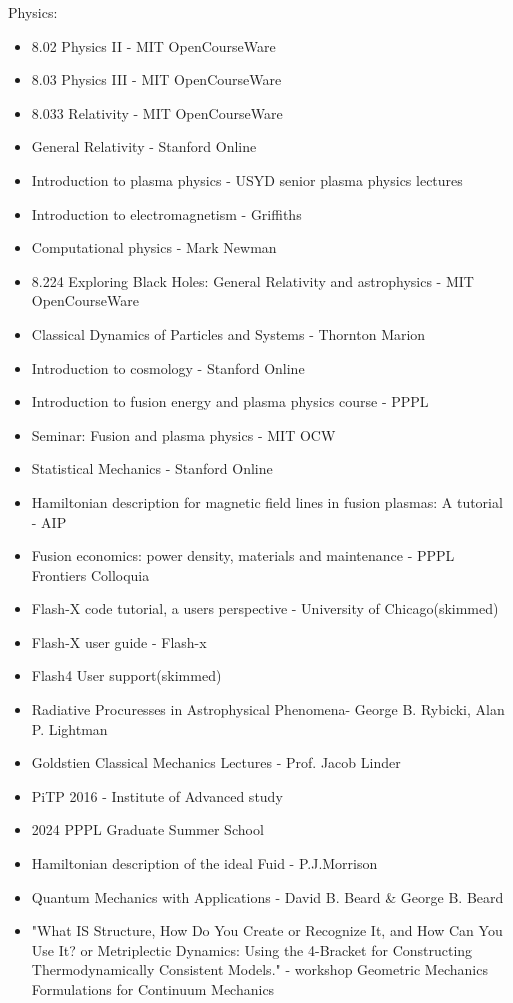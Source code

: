 Physics:
\begin{itemize}
    \item 8.02 Physics II - MIT OpenCourseWare
    \item 8.03 Physics III - MIT OpenCourseWare
    \item 8.033 Relativity - MIT OpenCourseWare
    \item General Relativity - Stanford Online
    \item Introduction to plasma physics - USYD senior plasma physics lectures
    \item Introduction to electromagnetism - Griffiths
    \item Computational physics - Mark Newman
    \item 8.224 Exploring Black Holes: General Relativity and astrophysics - MIT OpenCourseWare
    \item Classical Dynamics of Particles and Systems - Thornton Marion
    \item Introduction to cosmology - Stanford Online
    \item Introduction to fusion energy and plasma physics course - PPPL
    \item Seminar: Fusion and plasma physics - MIT OCW
    \item Statistical Mechanics - Stanford Online
    \item Hamiltonian description for magnetic field lines in fusion plasmas: A tutorial - AIP
    \item Fusion economics: power density, materials and maintenance - PPPL Frontiers Colloquia
    \item Flash-X code tutorial, a users perspective - University of Chicago(skimmed) 
    \item Flash-X user guide - Flash-x
    \item Flash4 User support(skimmed)
    \item Radiative Procuresses in Astrophysical Phenomena- George B. Rybicki, Alan P. Lightman
    \item Goldstien Classical Mechanics Lectures - Prof. Jacob Linder
    \item PiTP 2016 - Institute of Advanced study
    \item 2024 PPPL Graduate Summer School
    \item Hamiltonian description of the ideal Fuid - P.J.Morrison
    \item Quantum Mechanics with Applications - David B. Beard \& George B. Beard
    \item "What IS Structure, How Do You Create or Recognize It, and How Can You Use It? or Metriplectic Dynamics: Using the 4-Bracket for Constructing Thermodynamically Consistent Models." - workshop Geometric Mechanics Formulations for Continuum Mechanics

\end{itemize}
